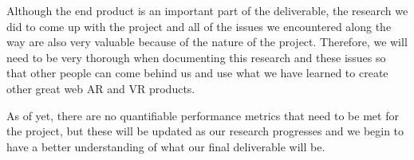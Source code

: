 \documentclass[10pt,peerreview]{IEEEtran}
\begin{document}
Although the end product is an important part of the deliverable, the research we did to come up with the project and all of the issues we encountered along the way are also very valuable because of the nature of the project. Therefore, we will need to be very thorough when documenting this research and these issues so that other people can come behind us and use what we have learned to create other great web AR and VR products. 

As of yet, there are no quantifiable performance metrics that need to be met for the project, but these will be updated as our research progresses and we begin to have a better understanding of what our final deliverable will be. 
\end{document}
